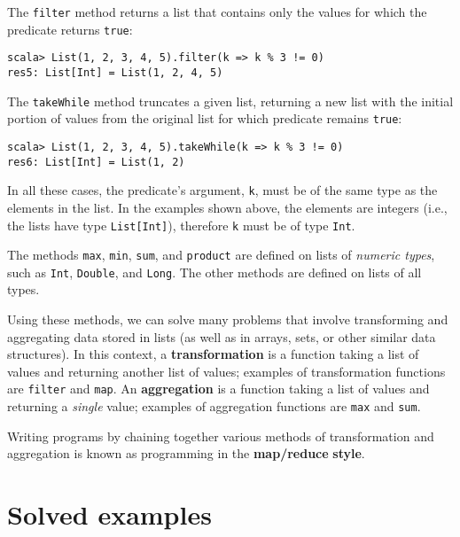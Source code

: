 The \lstinline!filter! method returns a list that contains only the
values for which the predicate returns \texttt{}\lstinline!true!:

\begin{lstlisting}
scala> List(1, 2, 3, 4, 5).filter(k => k % 3 != 0)
res5: List[Int] = List(1, 2, 4, 5)
\end{lstlisting}

The \texttt{}\lstinline!takeWhile! method truncates a given list,
returning a new list with the initial portion of values from the original
list for which predicate remains \lstinline!true!:
\begin{lstlisting}
scala> List(1, 2, 3, 4, 5).takeWhile(k => k % 3 != 0)
res6: List[Int] = List(1, 2)
\end{lstlisting}

In all these cases, the predicate\textsf{'}s argument, \lstinline!k!, must
be of the same type as the elements in the list. In the examples shown
above, the elements are integers (i.e., the lists have type \lstinline!List[Int]!),
therefore \texttt{}\lstinline!k! must be of type \lstinline!Int!.

The methods \lstinline!max!, \lstinline!min!, \lstinline!sum!,
and \texttt{}\lstinline!product! are defined on lists of \emph{numeric
types}, such as \lstinline!Int!, \lstinline!Double!, and \lstinline!Long!.
The other methods are defined on lists of all types.

Using these methods, we can solve many problems that involve transforming
and aggregating data stored in lists (as well as in arrays, sets,
or other similar data structures). In this context, a \textbf{transformation}
is a function taking a list of values and returning another list of
values; examples of transformation functions are \texttt{}\lstinline!filter!
and \lstinline!map!. An \textbf{aggregation}
is a function taking a list of values and returning a \emph{single}
value; examples of aggregation functions are \texttt{}\lstinline!max!
and \lstinline!sum!.

Writing programs by chaining together various methods of transformation
and aggregation is known as programming in the \textbf{map/reduce}
\textbf{style}.

\section{Solved examples}

